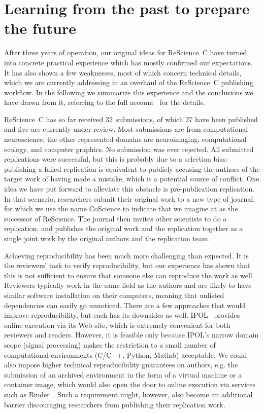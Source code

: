 \documentclass[runningheads]{llncs}
\begin{document}
\section{Learning from the past to prepare the future}

After three years of operation, our original ideas for ReScience~C have turned into concrete practical experience which has mostly confirmed our expectations. It has also shown a few weaknesses, most of which concern technical details, which we are currently addressing in an overhaul of the ReScience~C publishing workflow. In the following we summarize this experience and the conclusions we have drawn from it, referring to the full account~\cite{RougierSustainablecomputationalscience2017} for the details.

ReScience~C has so far received 32~submissions, of which 27 have been published and five are currently under review. Most submissions are from computational neuroscience, the other represented domains are neuroimaging, computational ecology, and computer graphics. No submission was ever rejected. All submitted replications were successful, but this is probably due to a selection bias: publishing a failed replication is equivalent to publicly accusing the authors of the target work of having made a mistake, which is a potential source of conflict. One idea we have put forward to alleviate this obstacle is pre-publication replication. In that scenario, researchers submit their original work to a new type of journal, for which we use the name CoScience to indicate that we imagine at as the successor of ReScience. The journal then invites other scientists to do a replication, and publishes the original work and the replication together as a single joint work by the original authors and the replication team.

Achieving reproducibility has been much more challenging than expected. It is the reviewers' task to verify reproducibility, but our experience has shown that this is not sufficient to ensure that someone else can reproduce the work as well. Reviewers typically work in the same field as the authors and are likely to have similar software installation on their computers, meaning that unlisted dependencies can easily go unnoticed. There are a few approaches that would improve reproducibility, but each has its downsides as well. IPOL~\cite{limareIPOLReviewedPublication2012} provides online execution via its Web site, which is extremely convenient for both reviewers and readers. However, it is feasible only because IPOL's narrow domain scope (signal processing) makes the restriction to a small number of computational environments (C/C++, Python, Matlab) acceptable. We could also impose higher technical reproducibility guarantees on authors, e.g. the submission of an archived environment in the form of a virtual machine or a container image, which would also open the door to online execution via services such as Binder~\cite{thebinderteamBinder2017}. Such a requirement might, however, also become an additional barrier discouraging researchers from publishing their replication work.
\end{document}

